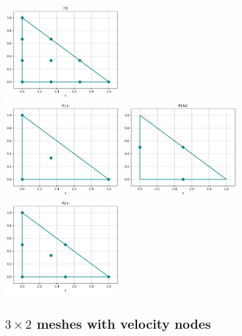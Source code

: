 \begin{center}
\includegraphics[width=5cm]{python_codes/fieldstone_120/spaces/P3_nodes}\\
\includegraphics[width=5cm]{python_codes/fieldstone_120/spaces/P1+_nodes}
\includegraphics[width=5cm]{python_codes/fieldstone_120/spaces/P1NC_nodes}
\includegraphics[width=5cm]{python_codes/fieldstone_120/spaces/P2+_nodes}
\end{center}

\newpage
\subsection*{$3\times 2$ meshes with velocity nodes}

\begin{multicols}{2}


\begin{tiny}

\end{tiny}
\end{multicols}

